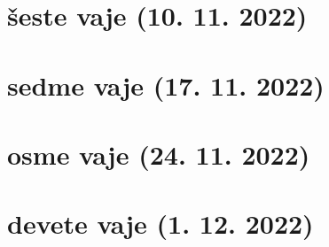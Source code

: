 \documentclass{homework}
\begin{document}
\section{šeste vaje (10. 11. 2022)}

\section{sedme vaje (17. 11. 2022)}


\section{osme vaje (24. 11. 2022)}

\section{devete vaje (1. 12. 2022)}


% 
% 
\end{document}
